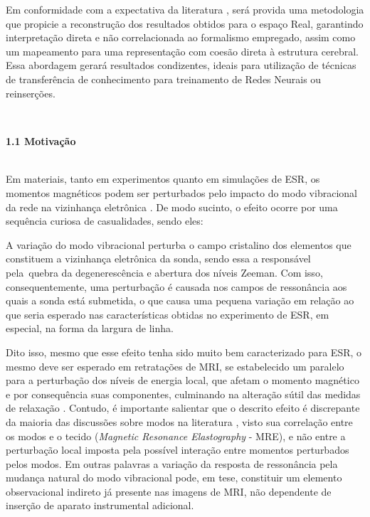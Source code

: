 \documentclass[a4paper, 12pt]{report}
\begin{document}
Em conformidade com a expectativa da literatura \cite{Zitu2024Dec,Hays2024Dec,Binzagr2024Apr}, será provida uma metodologia que propicie a reconstrução dos resultados obtidos para o espaço Real, garantindo interpretação direta e não correlacionada ao formalismo empregado, assim como um mapeamento para uma representação com coesão direta à estrutura cerebral. Essa abordagem gerará resultados condizentes, ideais para utilização de técnicas de transferência de conhecimento para treinamento de Redes Neurais \cite{Hussain2024,Mane2024} ou reinserções.

$\frac{}{}$\\
\begin{Large}
	\textbf{1.1 Motivação}
\end{Large}
$\frac{}{}$\\

Em materiais, tanto em experimentos quanto em simulações de ESR, os momentos magnéticos podem ser perturbados pelo impacto do modo vibracional da rede na vizinhança eletrônica \cite{Carlone2022,Souza2020,Stankiewicz2023,Kim2014, Lesseux2017, Calvo1971}. De modo sucinto, o efeito ocorre por uma sequência curiosa de casualidades, sendo eles:

A variação do modo vibracional perturba o campo cristalino dos elementos que constituem a vizinhança eletrônica da sonda, sendo essa a responsável pela quebra da degenerescência e abertura dos níveis Zeeman. Com isso, consequentemente, uma perturbação é causada nos campos de ressonância aos quais a sonda está submetida, o que causa uma pequena variação em relação ao que seria esperado nas características obtidas no experimento de ESR, em especial, na forma da largura de linha.

Dito isso, mesmo que esse efeito tenha sido muito bem caracterizado para ESR, o mesmo deve ser esperado em retratações de MRI, se estabelecido um paralelo para a perturbação dos níveis de energia local, que afetam o momento magnético e por consequência suas componentes, culminando na alteração sútil das medidas de relaxação \cite{Carlone2022, Lesseux2017}. Contudo, é importante salientar que o descrito efeito é discrepante da maioria das discussões sobre modos na literatura \cite{Mariappan2010, Xu2007, Hamhaber2010, Xydeas2005}, visto sua correlação entre os modos e o tecido (\textit{Magnetic Resonance Elastography} - MRE), e não entre a perturbação local imposta pela possível interação entre momentos perturbados pelos modos. Em outras palavras a variação da resposta de ressonância pela mudança natural do modo vibracional pode, em tese, constituir um elemento observacional indireto já presente nas imagens de MRI, não dependente de inserção de aparato instrumental adicional.
\end{document}
